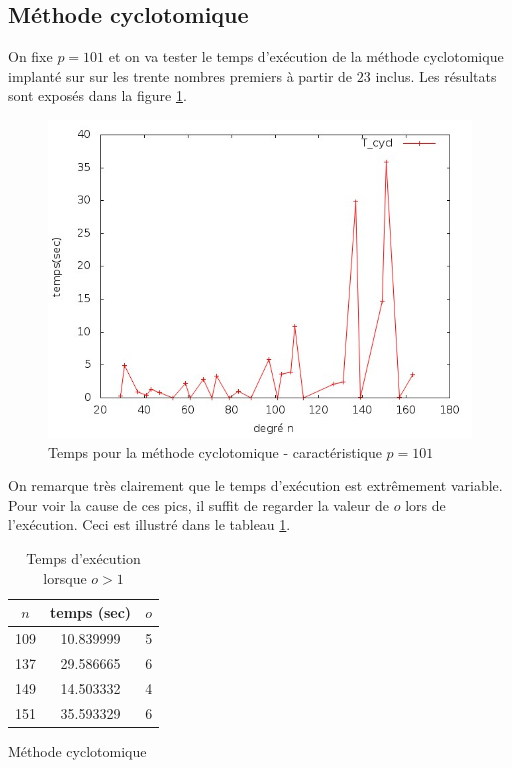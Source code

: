\documentclass[a4paper]{article} %
\numberwithin{section}{part}
\numberwithin{equation}{section}
\begin{document}
\subsection{Méthode cyclotomique}
On fixe $p = 101$ et on va tester le temps d'exécution de la méthode
cyclotomique implanté sur  sur les trente nombres premiers à partir de
$23$ inclus. Les résultats sont exposés dans la figure 
\ref{fig:tempscyclopfixed}.

\begin{figure}[H]
\begin{center}
\includegraphics[scale=0.6]{data_test15_testcycl1}
\caption{Temps pour la méthode cyclotomique - caractéristique $p = 101$}
\label{fig:tempscyclopfixed}
\end{center}
\end{figure}

On remarque très clairement que le temps d'exécution est extrêmement variable.
Pour voir la cause de ces pics, il suffit de regarder la valeur de $o$ lors de
l'exécution. Ceci est illustré dans le tableau \ref{tab:resnumcyclavecext}.

\begin{table}[H]
\centering
\begin{tabular}{|c|c|c|}
	\hline
	$n$ & temps (sec) & $o$\\
	\hline
	\hline
	109 & 10.839999 & 5\\
	\hline
	137 & 29.586665 & 6\\
	\hline
	149 & 14.503332 & 4\\
	\hline
	151 & 35.593329 & 6\\
	\hline
\end{tabular}
\caption{Temps d'exécution lorsque $o > 1$}
Méthode cyclotomique
\label{tab:resnumcyclavecext}
\end{table}
\end{document}
